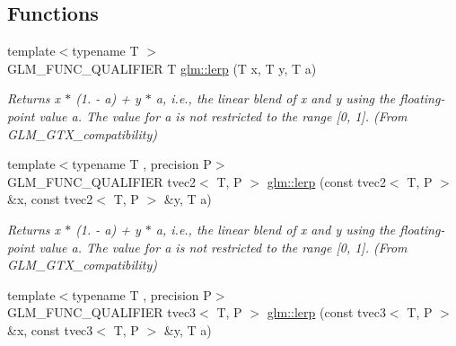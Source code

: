 \subsection*{Functions}
\begin{DoxyCompactItemize}
\item 
\hypertarget{group__gtx__compatibility_ga5494ba3a95ea6594c86fc75236886864}{{\footnotesize template$<$typename T $>$ }\\G\-L\-M\-\_\-\-F\-U\-N\-C\-\_\-\-Q\-U\-A\-L\-I\-F\-I\-E\-R T \hyperlink{group__gtx__compatibility_ga5494ba3a95ea6594c86fc75236886864}{glm\-::lerp} (T x, T y, T a)}\label{group__gtx__compatibility_ga5494ba3a95ea6594c86fc75236886864}

\begin{DoxyCompactList}\small\item\em Returns x $\ast$ (1. -\/ a) + y $\ast$ a, i.\-e., the linear blend of x and y using the floating-\/point value a. The value for a is not restricted to the range \mbox{[}0, 1\mbox{]}. (From G\-L\-M\-\_\-\-G\-T\-X\-\_\-compatibility) \end{DoxyCompactList}\item 
\hypertarget{group__gtx__compatibility_ga0aa79a146332650a1eb18ae996c653fe}{{\footnotesize template$<$typename T , precision P$>$ }\\G\-L\-M\-\_\-\-F\-U\-N\-C\-\_\-\-Q\-U\-A\-L\-I\-F\-I\-E\-R tvec2$<$ T, P $>$ \hyperlink{group__gtx__compatibility_ga0aa79a146332650a1eb18ae996c653fe}{glm\-::lerp} (const tvec2$<$ T, P $>$ \&x, const tvec2$<$ T, P $>$ \&y, T a)}\label{group__gtx__compatibility_ga0aa79a146332650a1eb18ae996c653fe}

\begin{DoxyCompactList}\small\item\em Returns x $\ast$ (1. -\/ a) + y $\ast$ a, i.\-e., the linear blend of x and y using the floating-\/point value a. The value for a is not restricted to the range \mbox{[}0, 1\mbox{]}. (From G\-L\-M\-\_\-\-G\-T\-X\-\_\-compatibility) \end{DoxyCompactList}\item 
\hypertarget{group__gtx__compatibility_gaf4c885ac72b8879b05777cb516c555c9}{{\footnotesize template$<$typename T , precision P$>$ }\\G\-L\-M\-\_\-\-F\-U\-N\-C\-\_\-\-Q\-U\-A\-L\-I\-F\-I\-E\-R tvec3$<$ T, P $>$ \hyperlink{group__gtx__compatibility_gaf4c885ac72b8879b05777cb516c555c9}{glm\-::lerp} (const tvec3$<$ T, P $>$ \&x, const tvec3$<$ T, P $>$ \&y, T a)}\label{group__gtx__compatibility_gaf4c885ac72b8879b05777cb516c555c9}


\end{DoxyCompactItemize}
